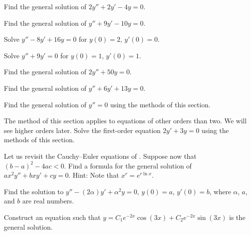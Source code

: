 \begin{exercise}
Find the general solution of $2y'' + 2y' -4 y = 0$.
\end{exercise}

\begin{exercise}
Find the general solution of $y'' + 9y' - 10 y = 0$.
\end{exercise}

\begin{exercise}
Solve $y'' - 8y' + 16 y = 0$ for $y(0) = 2$, $y'(0) = 0$.
\end{exercise}

\begin{exercise}
Solve $y'' + 9y' = 0$ for $y(0) = 1$, $y'(0) = 1$.
\end{exercise}

\begin{exercise}
Find the general solution of $2y'' + 50y = 0$.
\end{exercise}

\begin{exercise}
Find the general solution of $y'' + 6 y' + 13 y = 0$.
\end{exercise}

\begin{exercise}
Find the general solution of $y'' = 0$ using the methods of this section.
\end{exercise}

\begin{exercise}
The method of this section applies to equations of other orders than two.
We will see higher orders later.
Solve the first-order equation
$2y' + 3y = 0$ using the methods of this section.
\end{exercise}

\begin{exercise}
Let us revisit the Cauchy--Euler equations of
.  Suppose now
that ${(b-a)}^2-4ac < 0$.  Find a formula for the general solution
of $a x^2 y'' + b x y' + c y = 0$.  Hint: Note that $x^r = e^{r \ln x}$.
\end{exercise}

\begin{exercise}
Find the solution to
$y''-(2\alpha) y' + \alpha^2 y=0$, $y(0) = a$, $y'(0)=b$,
where $\alpha$, $a$, and $b$ are real numbers.
\end{exercise}

\begin{exercise}
Construct an equation such that $y = C_1 e^{-2x} \cos(3x) + C_2 e^{-2x}
\sin(3x)$ is the general
solution.
\end{exercise}

